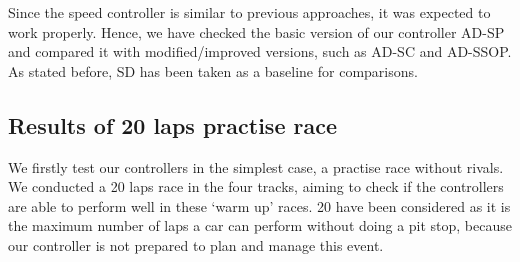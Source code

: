 \documentclass[runningheads,a4paper]{llncs}
\begin{document}
	Since the speed controller is similar to previous approaches, it was expected to work properly. Hence, we have checked the basic version of our controller AD-SP and compared it with modified/improved versions, such as AD-SC and AD-SSOP.
	As stated before, SD has been taken as a baseline for comparisons.
	
	
	
	\subsection{Results of 20 laps practise race}
	
	We firstly test our controllers in the simplest case, a practise race without rivals. 
	We conducted a 20 laps race in the four tracks, aiming to check if the controllers are able to perform well in these `warm up' races.
	20 have been considered as it is the maximum number of laps a car can perform without doing a pit stop, because our controller is not prepared to plan and manage this event. 
	
\end{document}
